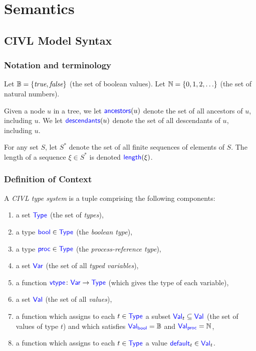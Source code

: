 \part{Semantics}
\label{part:semantics}

\chapter{CIVL Model Syntax}

\section{Notation and terminology}
\label{sec:notation}

Let $\B=\{\true,\false\}$ (the set of boolean values).  Let
$\N=\{0,1,2,\ldots\}$ (the set of natural numbers).

Given a node $u$ in a tree, we let $\ancestors(u)$ denote the set of
all ancestors of $u$, including $u$.  We let $\descendants(u)$ denote
the set of all descendants of $u$, including $u$.

For any set $S$, let $S^*$ denote the set of all finite sequences of
elements of $S$.  The length of a sequence $\xi\in S^*$ is denoted
$\len(\xi)$.  


\section{Definition of Context}
\label{sec:context}

\begin{definition}
  A \emph{CIVL type system} is a tuple comprising the following
  components:
  \begin{enumerate}
  \item a set $\Type$ (the set of \emph{types}),
  \item a type $\bool\in\Type$ (the \emph{boolean type}),
  \item a type $\proc\in\Type$ (the \emph{process-reference type}),
  \item a set $\Var$ (the set of all \emph{typed variables}),
  \item a function $\vtype\colon \Var\ra\Type$ (which gives the
    type of each variable),
  \item a set $\Val$ (the set of all \emph{values}),
  \item a function which assigns to each $t\in\Type$ a subset
    $\Val_t\subseteq\Val$ (the set of values of type $t$)
    and which satisfies $\Val_{\bool}=\B$ and $\Val_{\proc}=\N$,
  \item a function which assigns to each $t\in\Type$ a value
    $\default_t\in\Val_t$.
  \end{enumerate}
\end{definition}

